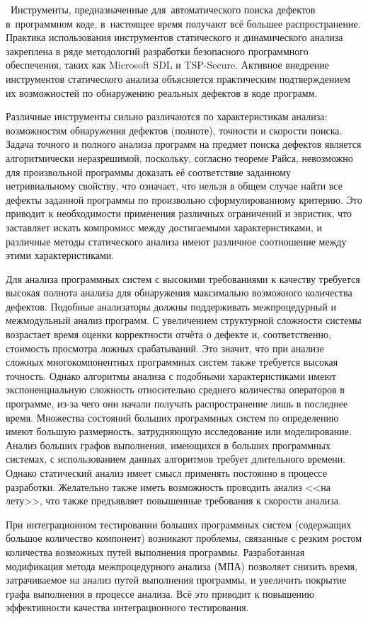 \actuality\
Инструменты, предназначенные для~автоматического поиска дефектов в~программном коде, в~настоящее время получают всё большее распространение. Практика использования инструментов статического и динамического анализа закреплена в ряде методологий разработки безопасного программного обеспечения, таких как Microsoft SDL и TSP-Secure. Активное внедрение инструментов статического анализа объясняется практическим подтверждением их возможностей по обнаружению реальных дефектов в коде программ. 

Различные инструменты сильно различаются по характеристикам анализа: возможностям обнаружения дефектов (полноте), точности и скорости поиска. Задача точного и полного анализа программ на предмет поиска дефектов является алгоритмически неразрешимой, поскольку, согласно теореме Райса, невозможно для произвольной программы доказать её соответствие заданному нетривиальному свойству, что означает, что нельзя в общем случае найти все дефекты заданной программы по произвольно сформулированному критерию. Это приводит к необходимости применения различных ограничений и эвристик, что заставляет искать компромисс между достигаемыми характеристиками, и различные методы статического анализа имеют различное соотношение между этими характеристиками.

Для анализа программных систем с высокими требованиями к качеству требуется высокая полнота анализа для обнаружения максимально возможного количества дефектов. Подобные анализаторы должны поддерживать межпроцедурный и межмодульный анализ программ. С увеличением структурной сложности системы возрастает время оценки корректности отчёта о дефекте и, соответственно, стоимость просмотра ложных срабатываний. Это значит, что при анализе сложных многокомпонентных программных систем также требуется высокая точность. Однако алгоритмы анализа с подобными характеристиками имеют экспоненциальную сложность относительно среднего количества операторов в программе, из-за чего они начали получать распространение лишь в последнее время. Множества состояний больших программных систем по определению имеют большую размерность, затрудняющую исследование или моделирование. Анализ больших графов выполнения, имеющихся в больших программных системах, с использованием данных алгоритмов требует длительного времени. Однако статический анализ имеет смысл применять постоянно в процессе разработки. Желательно также иметь возможность проводить анализ <<на лету>>, что также предъявляет повышенные требования к скорости анализа.

При интеграционном тестировании больших программных систем (содержащих большое количество компонент) возникают проблемы, связанные с резким ростом количества возможных путей выполнения программы. Разработанная модификация метода межпроцедурного анализа (МПА) позволяет снизить время, затрачиваемое на анализ путей выполнения программы, и увеличить покрытие графа выполнения в процессе анализа. Всё это приводит к повышению эффективности качества интеграционного тестирования.

